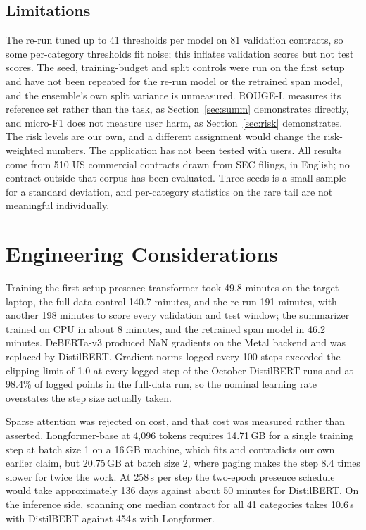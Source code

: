 \documentclass[journal]{IEEEtran}
\begin{document}
\subsection{Limitations}
\label{sec:limits}
The re-run tuned up to 41 thresholds per model on 81 validation contracts, so some per-category
thresholds fit noise; this inflates validation scores but not test scores. The seed, training-budget
and split controls were run on the first setup and have not been repeated for the re-run model or
the retrained span model, and
the ensemble's own split variance is unmeasured. ROUGE-L measures its reference set rather than the
task, as Section~\ref{sec:summ} demonstrates directly, and micro-F1 does not measure user harm, as
Section~\ref{sec:risk} demonstrates. The risk levels are our own, and a different assignment would
change the risk-weighted numbers. The application has not been tested with users. All results come
from 510 US commercial contracts drawn from SEC filings, in English; no contract outside that corpus
has been evaluated. Three seeds is a small sample for a standard deviation, and per-category
statistics on the rare tail are not meaningful individually.

\section{Engineering Considerations}
Training the first-setup presence transformer took 49.8 minutes on the target laptop, the
full-data control 140.7 minutes, and the re-run 191 minutes, with another 198 minutes to score every
validation and test window; the summarizer trained on CPU in about 8 minutes, and the retrained span model in 46.2 minutes. DeBERTa-v3 produced NaN
gradients on the Metal backend and was replaced by DistilBERT. Gradient norms logged every 100 steps
exceeded the clipping limit of 1.0 at every logged step of the October DistilBERT runs and at 98.4\%
of logged points in the full-data run, so the nominal learning rate overstates the step size actually
taken.

Sparse attention was rejected on cost, and that cost was measured rather than asserted.
Longformer-base at 4,096 tokens requires 14.71\,GB for a single training step at batch size 1 on a
16\,GB machine, which fits and contradicts our own earlier claim, but 20.75\,GB at batch size 2,
where paging makes the step 8.4 times slower for twice the work. At 258\,s per step the two-epoch
presence schedule would take approximately 136 days against about 50 minutes for DistilBERT. On the
inference side, scanning one median contract for all 41 categories takes 10.6\,s with DistilBERT
against 454\,s with Longformer.
\end{document}
